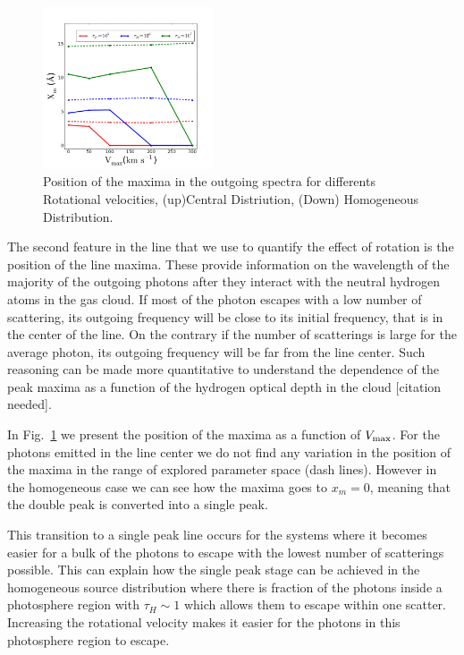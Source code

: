 \documentclass[usenatbib]{mn2e}
\begin{document}
\begin{figure}
    \includegraphics[width=0.45\textwidth]{maximumvsVmax.png}
\caption{Position of the maxima
    in the outgoing spectra for differents Rotational velocities,
    (up)Central Distriution, (Down) Homogeneous Distribution.\label{fig:maximumsvsvelocity}} 
\end{figure}

The second feature in the line that we use to quantify the effect of
rotation is the position of the line maxima. These provide information
on the wavelength of the majority of the outgoing photons after
they interact with the neutral hydrogen atoms in the gas cloud. If
most of the photon escapes with a low number of scattering, its
outgoing frequency will be close to its initial frequency, that is in
the center of the line. On the contrary if the number of scatterings
is large for the average photon, its outgoing frequency will be far
from the line center. Such reasoning can be made more quantitative to
understand the dependence of the peak maxima as a function of the
hydrogen optical depth in the cloud [citation needed].


In Fig.~\ref{fig:maximumsvsvelocity} we present the position
of the maxima as a function of $V_{\rm max}$. For the photons emitted
in the line center we do not find any variation in the position of the
maxima in the range of explored parameter space (dash lines). However in the
homogeneous case we can see how the maxima goes to $x_{m}=0$, meaning
that the double peak is converted into a single peak.

This transition to a single peak line occurs for the systems where it
becomes easier for a bulk of the photons to escape with the lowest
number of scatterings possible. This can explain how the single peak
stage can be achieved in the homogeneous source distribution where
there is fraction of the photons inside a photosphere region with
$\tau_{H}\sim 1$ which allows them to escape within one
scatter. Increasing the rotational velocity makes it easier for the
photons in this photosphere region to escape.
\end{document}

